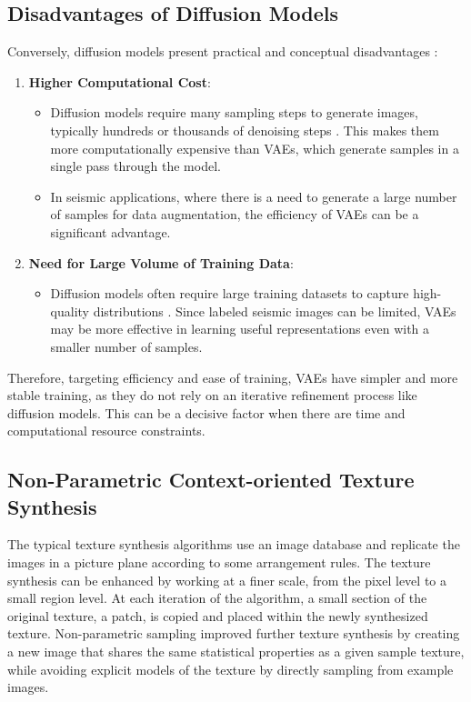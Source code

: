 \documentclass{ieeeaccess}
\begin{document}
\subsection*{Disadvantages of Diffusion Models}
Conversely, diffusion models present practical and conceptual disadvantages \cite{ref17}:
\begin{enumerate}
    \item \textbf{Higher Computational Cost}:
    \begin{itemize}
        \item Diffusion models require many sampling steps to generate images, typically hundreds or thousands of denoising steps \cite{ref17}. This makes them more computationally expensive than VAEs, which generate samples in a single pass through the model.
        \item In seismic applications, where there is a need to generate a large number of samples for data augmentation, the efficiency of VAEs can be a significant advantage. 
    \end{itemize}
    \item \textbf{Need for Large Volume of Training Data}:
    \begin{itemize}
        \item Diffusion models often require large training datasets to capture high-quality distributions  \cite{ref17}. Since labeled seismic images can be limited, VAEs may be more effective in learning useful representations even with a smaller number of samples.
    \end{itemize}
\end{enumerate}

Therefore, targeting efficiency and ease of training, VAEs have simpler and more stable training, as they do not rely on an iterative refinement process like diffusion models. This can be a decisive factor when there are time and computational resource constraints.

\subsection{Non-Parametric Context-oriented Texture Synthesis}

The typical texture synthesis algorithms use an image database and replicate the images in a picture plane according to some arrangement rules. The texture synthesis can be enhanced by working at a finer scale, from the pixel level to a small region level. At each iteration of the algorithm, a small section of the original texture, a patch, is copied and placed within the newly synthesized texture. Non-parametric sampling \cite{ref12} improved further texture synthesis by creating a new image that shares the same statistical properties as a given sample texture, while avoiding explicit models of the texture by directly sampling from example images.
\end{document}
